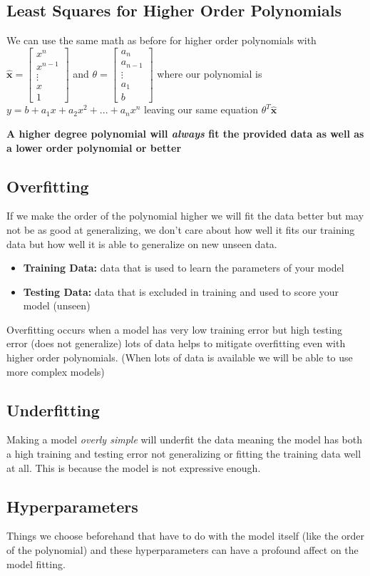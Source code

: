 \documentclass[twocolumn, letter, 10pt, landscape]{article}
\newcommand{\mb}{\mathbf}
\newcommand{\tb}{\textbf}
\newcommand{\ti}{\textit}
\newcommand{\bms}{\begin{bmatrix}}
\newcommand{\bme}{\end{bmatrix}}
\newcommand{\bit}{\vspace{-0.1in}\begin{itemize}\setlength\itemsep{-0.05in}}
\newcommand{\eit}{\end{itemize}\vspace{-0.1in}}
\begin{document}
\subsection{Least Squares for Higher Order Polynomials}
We can use the same math as before for higher order polynomials with $\hat{\mb{x}} = \bms x^n \\ x^{n-1} \\ \vdots \\ x \\ 1 \bme$ and $\theta = \bms a_n \\ a_{n-1} \\ \vdots \\ a_1 \\ b \bme$ where our polynomial is $y=b+a_1x+a_2x^2+...+a_nx^n$ leaving our same equation $\theta^T\hat{\mb{x}}$

\textbf{A higher degree polynomial will \textit{always} fit the provided data as well as a lower order polynomial or better}

\subsection{Overfitting}
If we make the order of the polynomial higher we will fit the data better but may not be as good at generalizing, we don't care about how well it fits our training data but how well it is able to generalize on new unseen data.
\bit{}
\item
  \tb{Training Data:} data that is used to learn the parameters of your model
\item
  \tb{Testing Data:} data that is excluded in training and used to score your model (unseen)
\eit{}
Overfitting occurs when a model has very low training error but high testing error (does not generalize) lots of data helps to mitigate overfitting even with higher order polynomials. (When lots of data is available we will be able to use more complex models)

\subsection{Underfitting}
Making a model \ti{overly simple} will underfit the data meaning the model has both a high training and testing error not generalizing or fitting the training data well at all. This is because the model is not expressive enough.

\subsection{Hyperparameters}
Things we choose beforehand that have to do with the model itself (like the order of the polynomial) and these hyperparameters can have a profound affect on the model fitting.
\end{document}
